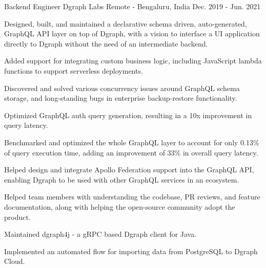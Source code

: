 \begin{cventries}
    \cventry
    {Backend Engineer} %
    {Dgraph Labs} %
    {Remote - Bengaluru, India} %
    {Dec. 2019 - Jun. 2021} %
    {
        \begin{cvitems} %
            \item {Designed, built, and maintained a declarative schema driven, auto-generated, GraphQL API layer on top of Dgraph, with a vision to interface a UI application directly to Dgraph without the need of an intermediate backend.}
            \item {Added support for integrating custom business logic, including JavaScript lambda functions to support serverless deployments.}
            \item {Discovered and solved various concurrency issues around GraphQL schema storage, and long-standing bugs in enterprise backup-restore functionality.}
            \item {Optimized GraphQL auth query generation, resulting in a 10x improvement in query latency.}
            \item {Benchmarked and optimized the whole GraphQL layer to account for only 0.13\% of query execution time, adding an improvement of 33\% in overall query latency.}
            \item {Helped design and integrate Apollo Federation support into the GraphQL API, enabling Dgraph to be used with other GraphQL services in an ecosystem.}
            \item {Helped team members with understanding the codebase, PR reviews, and feature documentation, along with helping the open-source community adopt the product.}
            \item {Maintained dgraph4j - a gRPC based Dgraph client for Java.}
            \item {Implemented an automated flow for importing data from PostgreSQL to Dgraph Cloud.}
        \end{cvitems}
    }


\end{cventries}
